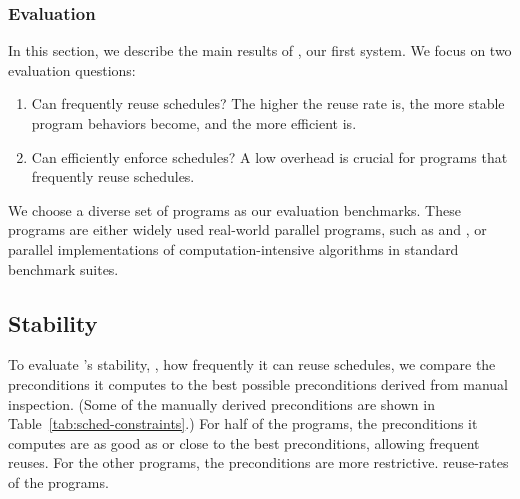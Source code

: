 \subsubsection{Evaluation} \label{sec:tern-eval}
In this section, we describe the main results of \tern, our first \smt
system.  We focus on two evaluation questions:

\begin{enumerate}

\item[\S\ref{sec:stable}:] Can \tern frequently reuse schedules?  The
  higher the reuse rate is, the more stable program behaviors become, and
  the more efficient \tern is.

\item[\S\ref{sec:efficient}:] Can \tern efficiently enforce schedules?  A
  low overhead is crucial for programs that frequently reuse schedules.




\end{enumerate}

We choose a diverse set of \nprog programs as our evaluation benchmarks.
These programs are either widely used real-world parallel programs, such
as \apache and \pbzip, or parallel
implementations of computation-intensive algorithms in standard benchmark
suites.

\subsection{Stability} \label{sec:stable}

To evaluate \tern's stability, \ie, how frequently it can reuse schedules,
we compare the preconditions it computes to the best possible
preconditions derived from manual inspection. (Some of the manually
derived preconditions are shown in Table~\ref{tab:sched-constraints}.)
For half of the \nprog programs, the preconditions it computes are as
good as or close to the best preconditions, allowing frequent reuses.
For the other programs, the preconditions are more restrictive.
reuse-rates of the programs.

